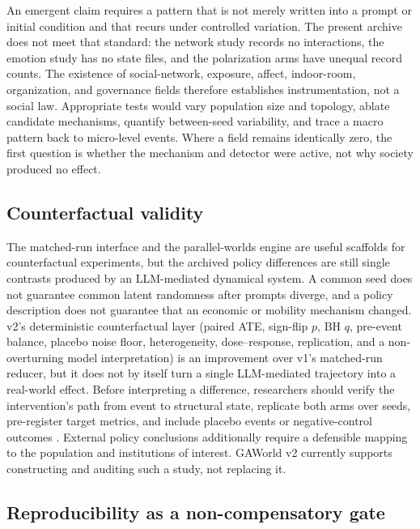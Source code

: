 An emergent claim requires a pattern that is not merely written into a
prompt or initial condition and that recurs under controlled variation.
The present archive does not meet that standard: the network study records
no interactions, the emotion study has no state files, and the
polarization arms have unequal record counts.  The existence of
social-network, exposure, affect, indoor-room, organization, and
governance fields therefore establishes instrumentation, not a social law.
Appropriate tests would vary population size and topology, ablate candidate
mechanisms, quantify between-seed variability, and trace a macro pattern
back to micro-level events.  Where a field remains identically zero, the
first question is whether the mechanism and detector were active, not why
society produced no effect.

\subsection{Counterfactual validity}

The matched-run interface and the parallel-worlds engine are useful
scaffolds for counterfactual experiments, but the archived policy
differences are still single contrasts produced by an LLM-mediated
dynamical system.  A common seed does not guarantee common latent
randomness after prompts diverge, and a policy description does not
guarantee that an economic or mobility mechanism changed.  v2's
deterministic counterfactual layer (paired ATE, sign-flip $p$, BH $q$,
pre-event balance, placebo noise floor, heterogeneity, dose--response,
replication, and a non-overturning model interpretation) is an
improvement over v1's matched-run reducer, but it does not by itself
turn a single LLM-mediated trajectory into a real-world effect.  Before
interpreting a difference, researchers should verify the intervention's
path from event to structural state, replicate both arms over seeds,
pre-register target metrics, and include placebo events or
negative-control outcomes \citep{lipsitch2010negative}.  External policy
conclusions additionally require a defensible mapping to the population
and institutions of interest.  GAWorld v2 currently supports constructing
and auditing such a study, not replacing it.

\subsection{Reproducibility as a non-compensatory gate}

